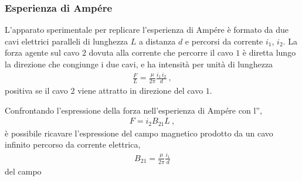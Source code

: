\documentclass[letterpaper,10pt,italian]{jupyterBook}
\begin{document}
\subsubsection{Esperienza di Ampére}
\label{\detokenize{ch/electromagnetism/electromagnetism-steady:esperienza-di-ampere}}\label{\detokenize{ch/electromagnetism/electromagnetism-steady:physics-hs-electromagnetism-electromagnetism-steady-experience-oersted-ampere-ampere}}
\sphinxAtStartPar
L’apparato sperimentale per replicare l’esperienza di Ampére è formato da due cavi elettrici paralleli di lunghezza \(L\) a distanza \(d\) e percorsi da corrente \(i_1\), \(i_2\). La forza agente sul cavo \(2\) dovuta alla corrente che percorre il cavo \(1\) è diretta lungo la direzione che congiunge i due cavi, e ha intensità per unità di lunghezza
\begin{equation*}
\begin{split}\frac{F}{L} = \frac{\mu}{2 \pi} \frac{i_1 \, i_2}{d} \ ,\end{split}
\end{equation*}
\sphinxAtStartPar
positiva se il cavo \(2\) viene attratto in direzione del cavo \(1\).

\sphinxAtStartPar
Confrontando l’espressione della forza nell’esperienza di Ampére con l”{\hyperref[\detokenize{ch/electromagnetism/electromagnetism-steady:physics-hs-electromagnetism-electromagnetism-steady-experience-faraday}]{}},
\begin{equation*}
\begin{split}F = i_2 B_{21} L \ ,\end{split}
\end{equation*}
\sphinxAtStartPar
è possibile ricavare l’espressione del campo magnetico prodotto da un cavo infinito percorso da corrente elettrica,
\begin{equation*}
\begin{split}B_{21} = \frac{\mu}{2 \pi} \frac{i_1}{d}\end{split}
\end{equation*}
\sphinxAtStartPar
{}  del campo

\sphinxAtStartPar
{} 
\end{document}
